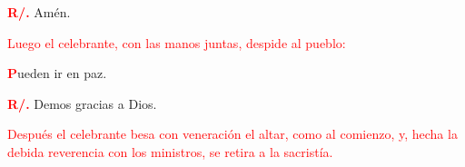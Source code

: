 \documentclass[12pt, letterpaper, spanish]{article}
\begin{document}
  \noindent
  \Large {\bfseries \textcolor{red}{R/.}} \hspace{0.5cm} Am\'en.

  \large{\textcolor{red}{Luego el celebrante, con las manos juntas, despide al pueblo:}}
  
  \lettrine[lines=1]{\bfseries \textcolor{red}{P}}{}\Large ueden ir en paz.

  \noindent
  \Large {\bfseries \textcolor{red}{R/.}} \hspace{0.5cm} Demos gracias a Dios.

  \large{\textcolor{red}{Despu\'es el celebrante besa con veneraci\'on el altar, como al comienzo, y, hecha la debida reverencia con los ministros, se retira a la sacrist\'ia.}}
\end{document}
